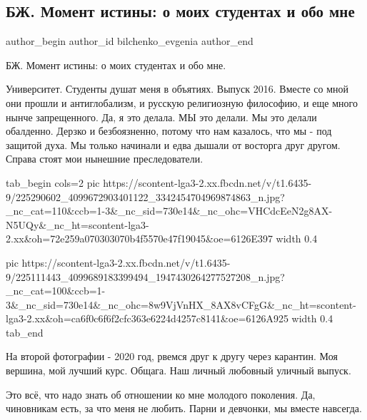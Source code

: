  
 
 
 
 
 
\subsection{БЖ. Момент истины: о моих студентах и обо мне}
\label{sec:27_07_2021.fb.bilchenko_evgenia.7.studenty}
 
\ifcmt
 author_begin
   author_id bilchenko_evgenia
 author_end
\fi

БЖ. Момент истины: о моих студентах и обо мне.

Университет. Студенты душат меня в объятиях. Выпуск 2016. Вместе со мной они
прошли и антиглобализм, и русскую религиозную философию, и еще много нынче
запрещенного.  Да, я это делала. МЫ это делали. Мы это делали обалденно. Дерзко
и безбоязненно, потому что нам казалось, что мы - под защитой духа. Мы только
начинали и едва дышали от восторга друг другом. Справа стоят мои нынешние
преследователи. 

\ifcmt
tab_begin cols=2
  pic https://scontent-lga3-2.xx.fbcdn.net/v/t1.6435-9/225290602_4099672903401122_3342454704969874863_n.jpg?_nc_cat=110&ccb=1-3&_nc_sid=730e14&_nc_ohc=VHCdcEeN2g8AX-N5UQy&_nc_ht=scontent-lga3-2.xx&oh=72e259a070303070b4f5570e47f19045&oe=6126E397
  width 0.4

  pic https://scontent-lga3-2.xx.fbcdn.net/v/t1.6435-9/225111443_4099689183399494_1947430264277527208_n.jpg?_nc_cat=100&ccb=1-3&_nc_sid=730e14&_nc_ohc=8w9VjVnHX_8AX8vCFgG&_nc_ht=scontent-lga3-2.xx&oh=ca6f0c6f6f2cfc363e6224d4257c8141&oe=6126A925
  width 0.4
tab_end
\fi

На второй фотографии - 2020 год, рвемся друг к другу через карантин. Моя
вершина, мой лучший курс.  Общага. Наш личный любовный уличный выпуск. 

Это всё, что надо знать об отношении ко мне молодого поколения. Да, чиновникам
есть, за что меня не любить. Парни и девчонки, мы вместе навсегда. 


